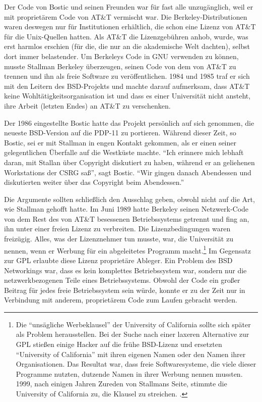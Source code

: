 Der Code von Bostic und seinen Freunden war für fast alle unzugänglich, weil er mit proprietärem Code von AT\&T vermischt war. Die Berkeley-Distributionen waren deswegen nur für Institutionen erhältlich, die schon eine Lizenz von AT\&T für die Unix-Quellen hatten. Als AT\&T die Lizenzgebühren anhob, wurde, was erst harmlos erschien (für die, die nur an die akademische Welt dachten), selbst dort immer belastender. Um Berkeleys Code in GNU verwenden zu können, musste Stallman Berkeley überzeugen, seinen Code von dem von AT\&T zu trennen und ihn als freie Software zu veröffentlichen. 1984 und 1985 traf er sich mit den Leitern des BSD-Projekts und machte darauf aufmerksam, dass AT\&T keine Wohltätigkeitsorganisation ist und dass es einer Universität nicht ansteht, ihre Arbeit (letzten Endes) an AT\&T zu verschenken. 

Der 1986 eingestellte Bostic hatte das Projekt persönlich auf sich genommen, die neueste BSD-Version auf die PDP-11 zu portieren. Während dieser Zeit, so Bostic, sei er mit Stallman in engen Kontakt gekommen, als er einen seiner gelegentlichen Überfalle auf die Westküste machte. "`Ich erinnere mich lebhaft daran, mit Stallan über Copyright diskutiert zu haben, während er an geliehenen Workstations der CSRG saß"', sagt Bostic. "`Wir gingen danach Abendessen und diskutierten weiter über das Copyright beim Abendessen."'

Die Argumente sollten schließlich den Ausschlag geben, obwohl nicht auf die Art, wie Stallman gehofft hatte. Im Juni 1989 hatte Berkeley seinen Netzwerk-Code von dem Rest des von AT\&T besessenen Betriebssystems getrennt und fing an, ihn unter einer freien Lizenz zu verbreiten. Die Lizenzbedingungen waren freizügig. Alles, was der Lizenznehmer tun musste, war, die Universität zu nennen, wenn er Werbung für ein abgeleitetes Programm macht.\footnote{Die "`unsägliche Werbeklausel"' der University of California sollte sich später als Problem herausstellen. Bei der Suche nach einer laxeren Alternative zur GPL stießen einige Hacker auf die frühe BSD-Lizenz und ersetzten "`University of California"' mit ihren eigenen Namen oder den Namen ihrer Organisationen. Das Resultat war, dass freie Softwaresysteme, die viele dieser Programme nutzten, dutzende Namen in ihrer Werbung nennen mussten. 1999, nach einigen Jahren Zureden von Stallmans Seite, stimmte die University of California zu, die Klausel zu streichen. \cite[Vgl.][]{bsdprob}.} Im Gegensatz zur GPL erlaubte diese Lizenz proprietäre Ableger. Ein Problem des BSD Networkings war, dass es kein komplettes Betriebssystem war, sondern nur die netzwerkbezogenen Teile eines Betriebssystems. Obwohl der Code ein großer Beitrag für jedes freie Betriebssystem sein würde, konnte er zu der Zeit nur in Verbindung mit anderem, proprietärem Code zum Laufen gebracht werden.

